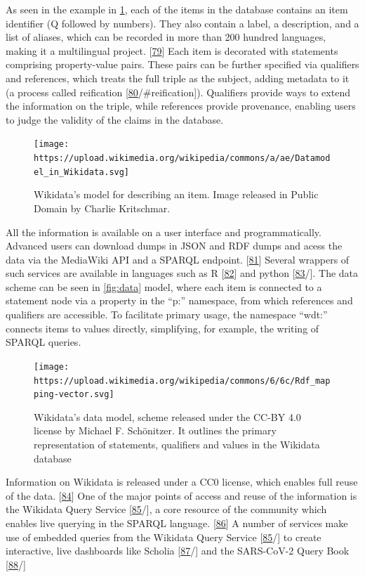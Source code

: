 As seen in the example in \ref{fig:douglas_adams}, each of the items in the database contains an item identifier (Q followed by numbers).
They also contain a label, a description, and a list of aliases, which can be recorded in more than 200 hundred languages, making it a multilingual project. {[}\protect\hyperlink{ref-S1Lksw7i}{79}{]}
Each item is decorated with statements comprising property-value pairs.
These pairs can be further specified via qualifiers and references, which treats the full triple as the subject, adding metadata to it (a process called reification {[}\protect\hyperlink{ref-ZhP1mKyl}{80}/\#reification{]}).
Qualifiers provide ways to extend the information on the triple, while references provide provenance, enabling users to judge the validity of the claims in the database.

\begin{figure}
\hypertarget{fig:douglas_adams}{%
\centering
\texttt{[image: https://upload.wikimedia.org/wikipedia/commons/a/ae/Datamodel\_in\_Wikidata.svg]}
\caption{Wikidata's model for describing an item. Image released in Public Domain by Charlie Kritschmar.}\label{fig:douglas_adams}
}
\end{figure}

All the information is available on a user interface and programmatically.
Advanced users can download dumps in JSON and RDF dumps and acess the data via the MediaWiki API and a SPARQL endpoint. {[}\protect\hyperlink{ref-4wSLyAPr}{81}{]}
Several wrappers of such services are available in languages such as R {[}\protect\hyperlink{ref-1HghnypzG}{82}{]} and python {[}\protect\hyperlink{ref-VKWfrtR1}{83}/{]}.
The data scheme can be seen in \ref{fig:data} model, where each item is connected to a statement node via a property in the ``p:'' namespace, from which references and qualifiers are accessible.
To facilitate primary usage, the namespace ``wdt:'' connects items to values directly, simplifying, for example, the writing of SPARQL queries.

\begin{figure}
\hypertarget{fig:datamodel}{%
\centering
\texttt{[image: https://upload.wikimedia.org/wikipedia/commons/6/6c/Rdf\_mapping-vector.svg]}
\caption{Wikidata's data model, scheme released under the CC-BY 4.0 license by Michael F. Schönitzer. It outlines the primary representation of statements, qualifiers and values in the Wikidata database}\label{fig:datamodel}
}
\end{figure}

Information on Wikidata is released under a CC0 license, which enables full reuse of the data. {[}\protect\hyperlink{ref-tQIJPG4k}{84}{]}
One of the major points of access and reuse of the information is the Wikidata Query Service {[}\protect\hyperlink{ref-2wDsXBwd}{85}/{]}, a core resource of the community which enables live querying in the SPARQL language. {[}\protect\hyperlink{ref-t66jYhqe}{86}{]}
A number of services make use of embedded queries from the Wikidata Query Service {[}\protect\hyperlink{ref-2wDsXBwd}{85}/{]} to create interactive, live dashboards like Scholia {[}\protect\hyperlink{ref-17P4zruFZ}{87}/{]} and the SARS-CoV-2 Query Book {[}\protect\hyperlink{ref-guMp3q1V}{88}/{]}

